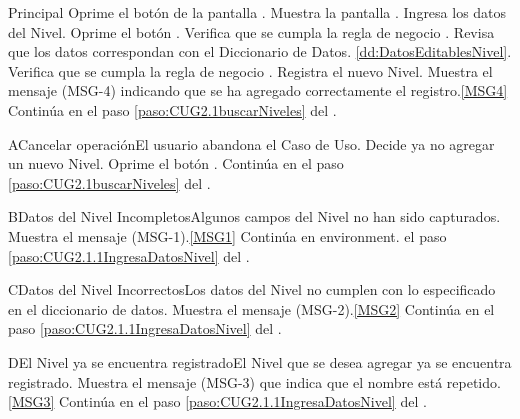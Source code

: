 	\begin{UCtrayectoria}{Principal}
			\UCpaso[\UCactor] Oprime el botón  de la pantalla .
			\UCpaso Muestra la pantalla .
			\UCpaso [\UCactor] Ingresa los datos del Nivel. \label{paso:CUG2.1.1IngresaDatosNivel}
			\UCpaso [\UCactor] Oprime el botón .
			\UCpaso Verifica que se cumpla la regla de negocio .  
			\UCpaso Revisa que los datos correspondan con el Diccionario de Datos. \ref{dd:DatosEditablesNivel}. 
			\UCpaso Verifica que se cumpla la regla de negocio .  
			\UCpaso Registra el nuevo Nivel.
			\UCpaso Muestra el mensaje (MSG-4) indicando que se ha agregado correctamente el registro.\ref{MSG4}
			\UCpaso Continúa en el paso \ref{paso:CUG2.1buscarNiveles} del .
	\end{UCtrayectoria}

	\begin{UCtrayectoriaA}{A}{Cancelar operación}{El usuario abandona el Caso de Uso.}
			\UCpaso[\UCactor] Decide ya no agregar un nuevo Nivel.
			\UCpaso[\UCactor] Oprime el botón .
			\UCpaso Continúa en el paso \ref{paso:CUG2.1buscarNiveles} del .
	\end{UCtrayectoriaA}
		
	\begin{UCtrayectoriaA}{B}{Datos del Nivel Incompletos}{Algunos campos del Nivel no han sido capturados.}
			\UCpaso Muestra el mensaje (MSG-1).\ref{MSG1}
			\UCpaso Continúa en environment. el paso \ref{paso:CUG2.1.1IngresaDatosNivel} del .
	\end{UCtrayectoriaA}

	\begin{UCtrayectoriaA}{C}{Datos del Nivel Incorrectos}{Los datos del Nivel no cumplen con lo especificado en el diccionario de datos.}
			\UCpaso Muestra el mensaje (MSG-2).\ref{MSG2}
			\UCpaso Continúa en el paso \ref{paso:CUG2.1.1IngresaDatosNivel} del .
	\end{UCtrayectoriaA}

		\begin{UCtrayectoriaA}{D}{El Nivel ya se encuentra registrado}{El Nivel que se desea agregar ya se encuentra registrado.}
			\UCpaso Muestra el mensaje (MSG-3) que indica que el nombre está repetido.\ref{MSG3}
			\UCpaso Continúa en el paso \ref{paso:CUG2.1.1IngresaDatosNivel} del .
		\end{UCtrayectoriaA}


